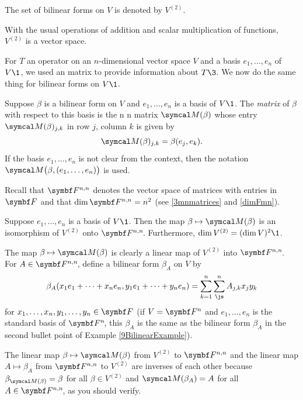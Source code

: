 {The set of bilinear forms on $V$ is denoted by $V^{(2)}\!$.}

With the usual operations of addition and scalar multiplication of functions, $V^{(2)}$ is a vector space.

For $T$ an operator on an $n$-dimensional vector space $V$ and a basis $e_1, \ldots, e_n$ of $V\1$, we used an  matrix to provide information about $T\3$. We now do the same thing for bilinear forms on $V\1$.

{Suppose $\beta$ is a bilinear form on $V$ and $e_1, \ldots, e_n$ is a basis of $V\1$. The \emph{matrix} of $\beta$ with respect to this basis is the \by n n matrix $\M(\beta)$ whose entry $\M(\beta)_{j,k}$ in row $j$, column $k$ is given by
\[
\M(\beta)_{j,k} = \beta(e_j, e_k).
\]
If the basis $e_1, \ldots, e_n$ is not clear from the context, then the notation $\M\paren[\big]{ \beta, (e_1, \ldots, e_n) }$ is used.}

Recall that $\F{n,n}$ denotes the vector space of  matrices with entries in $\F{}$ and that $\dim \F{n,n} = n^2$ (see \ref{3mnmatrices} and \ref{dimFmn}).

{Suppose $e_1, \ldots, e_n$ is a basis of $V\1$. Then the map $\beta \mapsto \M(\beta)$ is an isomorphism of $V^{(2)}$ onto $\FF{n,n}$.
Furthermore, $\dim V^{(2)} = (\dim V)^2\1$.}

\proof
The map $\beta \mapsto \M(\beta)$ is clearly a linear map of $V^{(2)}$ into $\FF{n,n}$.
For $A \in \FF{n,n}$, define a bilinear form $\beta_A$ on $V$ by
\vspace{-.06in} %
\[
\beta_A( x_1 e_1+ \cdots + x_n e_n, y_1 e_1 + \cdots + y_n e_n ) = \sum_{k=1}^n \sum_{\js}^n A_{j,k} x_j y_k
\vspace{-.06in} %
\]
for $x_1, \ldots, x_n, y_1, \ldots, y_n \in \F{}$ \big(if $V = \F{n}$ and $e_1, \ldots, e_n$ is the standard basis of $\FF{n}$, this $\beta_A$ is the same as the bilinear form $\beta_A$ in the second bullet point of Example \ref{9BilinearExample}\big).

The linear map $\beta \mapsto \M(\beta)$ from $V^{(2)}$ to $\F{n,n}$ and the linear map $A \mapsto \beta_A$ from
$\F{n,n}$ to $V^{(2)}$ are inverses of each other because $\beta_{\M(\beta)} = \beta$ for all $\beta \in V^{(2)}$ and
$\M(\beta_A) = A$ for all $A \in \FF{n,n}$, as you should verify.


